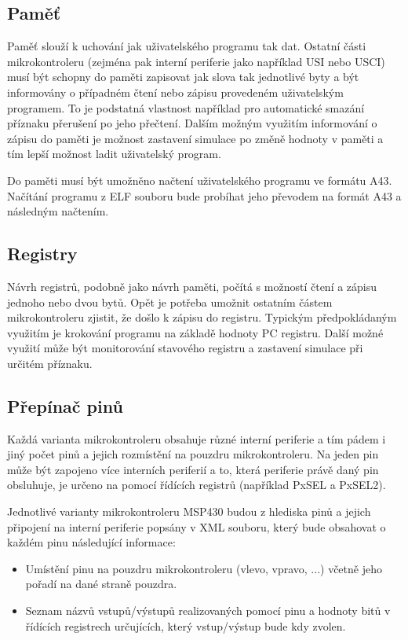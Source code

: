 \subsection{Paměť}

Paměť slouží k uchování jak uživatelského programu tak dat. Ostatní části mikrokontroleru (zejména pak interní periferie jako například USI nebo USCI) musí být schopny do paměti zapisovat jak slova tak jednotlivé byty a být informovány o případném čtení nebo zápisu provedeném uživatelským programem. To je podstatná vlastnost například pro automatické smazání příznaku přerušení po jeho přečtení. Dalším možným využitím informování o zápisu do paměti je možnost zastavení simulace po změně hodnoty v paměti a tím lepší možnost ladit uživatelský program.

Do paměti musí být umožněno načtení uživatelského programu ve formátu A43. Načítání programu z ELF souboru bude probíhat jeho převodem na formát A43 a následným načtením.

\subsection{Registry}

Návrh registrů, podobně jako návrh paměti, počítá s možností čtení a zápisu jednoho nebo dvou bytů. Opět je potřeba umožnit ostatním částem mikrokontroleru zjistit, že došlo k zápisu do registru. Typickým předpokládaným využitím je krokování programu na základě hodnoty PC registru. Další možné využití může být monitorování stavového registru a zastavení simulace při určitém příznaku.

\subsection{Přepínač pinů}

Každá varianta mikrokontroleru obsahuje různé interní periferie a tím pádem i jiný počet pinů a jejich rozmístění na pouzdru mikrokontroleru. Na jeden pin může být zapojeno více interních periferií a to, která periferie právě daný pin obsluhuje, je určeno na pomocí řídících registrů (například PxSEL a PxSEL2).

Jednotlivé varianty mikrokontroleru MSP430 budou z hlediska pinů a jejich připojení na interní periferie popsány v XML souboru, který bude obsahovat o každém pinu následující informace:

\begin{itemize}
\item Umístění pinu na pouzdru mikrokontroleru (vlevo, vpravo, ...) včetně jeho pořadí na dané straně pouzdra.
\item Seznam názvů vstupů/výstupů realizovaných pomocí pinu a hodnoty bitů v řídících registrech určujících, který vstup/výstup bude kdy zvolen.
\end{itemize}

